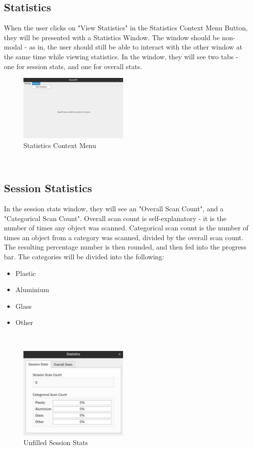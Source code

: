 \documentclass[conference]{IEEEtran}
\begin{document}
\subsection{Statistics}
When the user clicks on "View Statistics" in the Statistics Context Menu Button, they will be presented with a Statistics Window. The window should be non-modal - as in, the user should still be able to interact with the other window at the same time while viewing statistics. In the window, they will see two tabs - one for session stats, and one for overall stats.~\\

\begin{figure}[h]
    \centering
    \includegraphics[width=0.48\textwidth]{images/stats_context_menu.eps}
    \caption{Statistics Context Menu}
\end{figure}~\\

\subsection{Session Statistics}
In the session stats window, they will see an "Overall Scan Count", and a "Categorical Scan Count". Overall scan count is self-explanatory - it is the number of times any object was scanned. Categorical scan count is the number of times an object from a category was scanned, divided by the overall scan count. The resulting percentage number is then rounded, and then fed into the progress bar. The categories will be divided into the following:~\\

\begin{itemize}
\item Plastic
\item Aluminium
\item Glass
\item Other
\end{itemize}~\\

\begin{figure}[h]
    \centering
    \includegraphics[width=0.48\textwidth]{images/empty_session_stats.eps}
    \caption{Unfilled Session Stats}
\end{figure}
\end{document}
